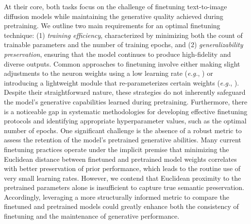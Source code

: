 At their core, both tasks focus on the challenge of finetuning text-to-image diffusion models while maintaining the generative quality achieved during pretraining. We outline two main requirements for an optimal finetuning technique: (1) \emph{training efficiency}, characterized by minimizing both the count of trainable parameters and the number of training epochs, and (2) \emph{generalizability preservation}, ensuring that the model continues to produce high-fidelity and diverse outputs. Common approaches to finetuning involve either making slight adjustments to the neuron weights using a low learning rate (\emph{e.g.}, \cite{ruiz2023dreambooth}) or introducing a lightweight module that re-parameterizes certain weights (\emph{e.g.}, \cite{hulora2022,zhang2023adding}). Despite their straightforward nature, these strategies do not inherently safeguard the model’s generative capabilities learned during pretraining. Furthermore, there is a noticeable gap in systematic methodologies for developing effective finetuning protocols and identifying appropriate hyperparameter values, such as the optimal number of epochs. One significant challenge is the absence of a robust metric to assess the retention of the model's pretrained generative abilities. Many current finetuning practices operate under the implicit premise that minimizing the Euclidean distance between finetuned and pretrained model weights correlates with better preservation of prior performance, which leads to the routine use of very small learning rates. However, we contend that Euclidean proximity to the pretrained parameters alone is insufficient to capture true semantic preservation. Accordingly, leveraging a more structurally informed metric to compare the finetuned and pretrained models could greatly enhance both the consistency of finetuning and the maintenance of generative performance.

